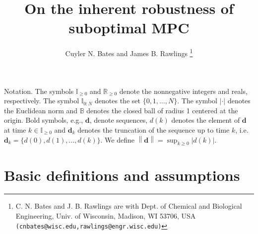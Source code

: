\documentclass{article}
\title{On the inherent robustness of suboptimal MPC}
\author{Cuyler N. Bates and James B. Rawlings
  \thanks{C. N. Bates and J. B. Rawlings are with Dept. of Chemical and
    Biological Engineering, Univ. of Wisconsin, Madison, WI 53706, USA
    \texttt{\footnotesize (cnbates@wisc.edu,rawlings@engr.wisc.edu)}}}
\newcommand{\abs}[1]{\left\lvert #1 \right\rvert}
\newcommand{\norm}[1]{\left\lVert #1 \right\rVert}
\begin{document}
\maketitle

Notation. The symbols $\mathbb{I}_{\geq 0}$ and $\mathbb{R}_{\geq 0}$ denote
the nonnegative integers and reals, respectively. The symbol $\mathbb{I}_{
0:N}$ denotes the set $\{0,1,\dots,N\}$.
The symbol $\abs{\cdot}$ denotes the Euclidean norm and 
$\mathbb{B}$ denotes the closed ball of radius 1 centered at the origin.
Bold symbols, e.g., $\mathbf{d}$, denote sequences, $d(k)$ denotes the element of $\mathbf{d}$ at time $k \in \mathbb{I}_{\geq{0}}$ and 
$\mathbf{d}_k$ denotes the truncation of the sequence up to time $k$, i.e.
$\mathbf{d}_k = \{d(0),d(1),\dots,d(k)\}$.
We define $\norm{\mathbf{d}} = \sup_{k \geq 0}\abs{d(k)}$. 


\section{Basic definitions and assumptions}
\end{document}
